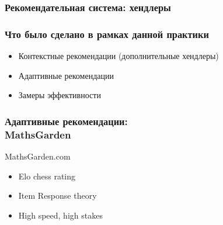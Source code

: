 \documentclass{beamer}
\begin{document}
\begin{frame}\frametitle{Рекомендательная система: хендлеры}
    \begin{figure}[H]
    \end{figure}
\end{frame}



\begin{frame}\frametitle{Что было сделано в рамках данной практики}

    \begin{itemize}
        \item Контекстные рекомендации (дополнительные хендлеры)
        \bigskip
        \item Адаптивные рекомендации
        \bigskip
        \item Замеры эффективности
    \end{itemize}

\end{frame}



\begin{frame}\frametitle{Адаптивные рекомендации: \\MathsGarden}

    \bigskip
    MathsGarden.com\cite{mathsgarden}
    
    \begin{itemize}
        \item Elo chess rating
        \item Item Response theory
        \item High speed, high stakes
    \end{itemize}
    
    \begin{figure}[t]
      \centering
      \hfill
      
    \end{figure}
    
\end{frame}
\end{document}
